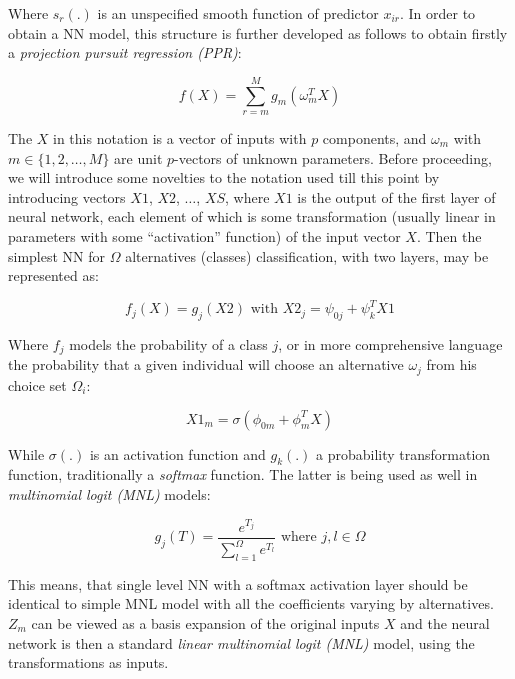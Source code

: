 \documentclass[11pt,]{article}
\begin{document}
Where \(s_r(.)\) is an unspecified smooth function of predictor
\(x_{ir}\). In order to obtain a NN model, this structure is further
developed as follows to obtain firstly a \emph{projection pursuit
regression (PPR)}:

\begin{equation}
f(X) = \sum_{r = m}^{M} g_m (\omega_{m}^{T} X)
\end{equation}

The \(X\) in this notation is a vector of inputs with \(p\) components,
and \(\omega_{m}\) with \(m \in \{1, 2, \dots, M \}\) are unit
\(p\)-vectors of unknown parameters. Before proceeding, we will
introduce some novelties to the notation used till this point by
introducing vectors \(X1\), \(X2\), \(\dots\), \(XS\), where \(X1\) is
the output of the first layer of neural network, each element of which
is some transformation (usually linear in parameters with some
``activation'' function) of the input vector \(X\). Then the simplest NN
for \(\Omega\) alternatives (classes) classification, with two layers,
may be represented as:

\begin{equation}
f_j (X) = g_j (X2) \text{ with } X2_j = \psi_{0j} + \psi_{k}^{T} X1
\end{equation}

Where \(f_j\) models the probability of a class \(j\), or in more
comprehensive language the probability that a given individual will
choose an alternative \(\omega_j\) from his choice set \(\Omega_i\):

\begin{equation}
X1_m = \sigma(\phi_{0m} + \phi_{m}^{T} X)
\end{equation}

While \(\sigma(.)\) is an activation function and \(g_k(.)\) a
probability transformation function, traditionally a \emph{softmax}
function. The latter is being used as well in \emph{multinomial logit
(MNL)} models:

\begin{equation}
g_j(T) = \frac{e^{T_j}}{\sum_{l = 1}^{\Omega} e^{T_l}} \text{ where } j,l \in \Omega
\end{equation}

This means, that single level NN with a softmax activation layer should
be identical to simple MNL model with all the coefficients varying by
alternatives. \(Z_m\) can be viewed as a basis expansion of the original
inputs \(X\) and the neural network is then a standard \emph{linear
multinomial logit (MNL)} model, using the transformations as inputs.
\end{document}
